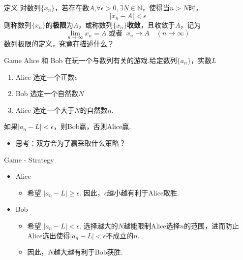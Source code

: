 \documentclass[]{beamer}
\begin{document}
\begin{frame}{定义}
    对数列$\{x_n\}$，若存在数$A$,$\forall \epsilon>0,\exists N\in \mathbb{N}$，使得当$n>N$时，
    \[
    |x_n-A|<\epsilon
    \]
    则称数列$\{x_n\}$的\textbf{极限}为$A$，或称数列$\{x_n\}$\textbf{收敛}，且收敛于$A$，记为
    \[
    \lim_{n\rightarrow\infty}x_n=A \text{ 或者 }\ x_n\rightarrow A\quad (n\rightarrow\infty)
    \]
    数列极限的定义，究竟在描述什么？
\end{frame}

\begin{frame}{Game}
    Alice 和 Bob 在玩一个与数列有关的游戏.给定数列$\{a_n\}$，实数$L$
    \begin{enumerate}
        \item Alice 选定一个正数$\epsilon$
        \item Bob 选定一个自然数$N$
        \item Alice 选定一个大于$N$的自然数$n$.
    \end{enumerate}
    如果$|a_n-L|<\epsilon$，则Bob赢，否则Alice赢.
    \begin{itemize}
        \item 思考：双方会为了赢采取什么策略？
    \end{itemize}
\end{frame}

\begin{frame}{Game - Strategy}
    \begin{itemize}
        \item Alice
        \begin{itemize}
            \item 希望 $|a_n-L|\ge\epsilon$. 因此，$\epsilon$越小越有利于Alice取胜.
        \end{itemize}
        \item Bob
        \begin{itemize}
            \item 希望 $|a_n-L|<\epsilon$. 选择越大的$N$越能限制Alice选择$n$的范围，进而防止Alice选出使得$|a_n-L|<\epsilon$不成立的$n$.
            \item 因此，$N$越大越有利于Bob获胜.
        \end{itemize}
    \end{itemize}
\end{frame}
\end{document}

